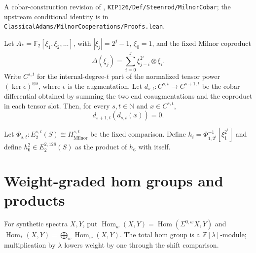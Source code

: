 \begin{theorem}
\label{sem:AdamsSynthetic:milnor-differential-square-zero}
A cobar-construction revision of \cite{KIPSource8cb35dad5f75},
\texttt{KIP126/Def/Steenrod/MilnorCobar}; the upstream conditional identity is in
\texttt{ClassicalAdams/MilnorCooperations/Proofs.lean}.\par
Let $A_*=\mathbb F_2[\xi_1,\xi_2,\ldots]$, with $|\xi_j|=2^j-1$,
$\xi_0=1$, and the fixed Milnor coproduct
\[
\Delta(\xi_j)=\sum_{i=0}^{j}\xi_{j-i}^{2^i}\otimes\xi_i.
\]
Write $C^{s,t}$ for the internal-degree-$t$ part of the normalized tensor
power $(\ker\epsilon)^{\otimes s}$, where $\epsilon$ is the augmentation.
Let $d_{s,t}\colon C^{s,t}\to C^{s+1,t}$ be the cobar differential obtained
by summing the two end coaugmentations and the coproduct in each tensor slot.
Then, for every $s,t\in\mathbb N$ and $x\in C^{s,t}$,
\[
d_{s+1,t}(d_{s,t}(x))=0.
\]
\end{theorem}

\begin{definition}
\label{sem:AdamsSynthetic:standard-classes}
Let $\Phi_{s,t}\colon E_2^{s,t}(S)\cong H^{s,t}_{\mathrm{Milnor}}$ be the fixed comparison. Define $h_i=\Phi_{1,2^i}^{-1}[\xi_1^{2^i}]$ and define $h_6^2\in E_2^{2,128}(S)$ as the product of $h_6$ with itself.
\end{definition}

\section{Weight-graded hom groups and products}

\begin{definition}
\label{sem:AdamsSynthetic:graded-hom}
For synthetic spectra $X,Y$, put $\operatorname{Hom}_w(X,Y)=\operatorname{Hom}(\Sigma^{0,w}X,Y)$ and $\operatorname{Hom}_*(X,Y)=\bigoplus_w\operatorname{Hom}_w(X,Y)$. The total hom group is a $\mathbb Z[\lambda]$-module; multiplication by $\lambda$ lowers weight by one through the shift comparison.
\end{definition}

